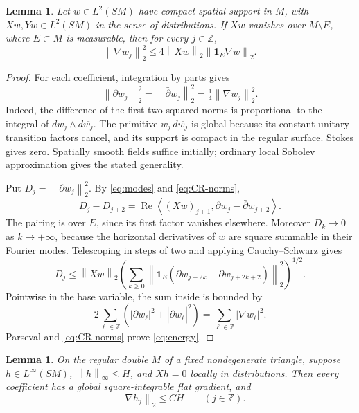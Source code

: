 \documentclass[11pt]{article}
\newtheorem{lemma}[theorem]{Lemma}
\theoremstyle{remark}
\newcommand{\Z}{\mathbb Z}
\newcommand{\ind}{\mathbf 1}
\newcommand{\pa}{\partial}
\newcommand{\pb}{\bar\partial}
\newcommand{\norm}[1]{\left\lVert#1\right\rVert}
\newcommand{\ip}[2]{\left\langle#1,#2\right\rangle}
\begin{document}
\begin{lemma}\label{lem:energy}
Let \(w\in L^2(SM)\) have compact spatial support in \(M\), with
\(Xw,Yw\in L^2(SM)\) in the sense of distributions.
If \(Xw\) vanishes over \(M\setminus E\),
where \(E\subset M\) is measurable, then for every \(j\in\Z\),
\begin{equation}\label{eq:energy}
 \norm{\nabla w_j}_2^2
 \le 4\norm{Xw}_2\norm{\ind_E\nabla w}_2.
\end{equation}
\end{lemma}

\begin{proof}
For each coefficient, integration by parts gives
\begin{equation}\label{eq:CR-norms}
 \norm{\pa w_j}_2^2=\norm{\pb w_j}_2^2
                  =\tfrac14\norm{\nabla w_j}_2^2.
\end{equation}
Indeed, the difference of the first two squared norms is proportional
to the integral of \(dw_j\wedge d\overline{w_j}\). The primitive
\(w_j\,d\overline{w_j}\) is global because its constant unitary
transition factors cancel, and its support is compact in the regular
surface. Stokes gives zero. Spatially smooth fields suffice initially;
ordinary local Sobolev approximation gives the stated generality.

Put \(D_j=\norm{\pa w_j}_2^2\). By \eqref{eq:modes} and
\eqref{eq:CR-norms},
\[
 D_j-D_{j+2}
 =\operatorname{Re}\ip{(Xw)_{j+1}}{\pa w_j-\pb w_{j+2}}.
\]
The pairing is over \(E\), since its first factor vanishes elsewhere.
Moreover \(D_k\to0\) as \(k\to+\infty\), because the horizontal
derivatives of \(w\) are square summable in their Fourier modes.
Telescoping in steps of two and applying Cauchy--Schwarz gives
\[
 D_j\le\norm{Xw}_2
 \left(\sum_{k\ge0}
  \norm{\ind_E(\pa w_{j+2k}-\pb w_{j+2k+2})}_2^2\right)^{1/2}.
\]
Pointwise in the base variable, the sum inside is bounded by
\[
 2\sum_{\ell\in\Z}(|\pa w_\ell|^2+|\pb w_\ell|^2)
       =\sum_{\ell\in\Z}|\nabla w_\ell|^2.
\]
Parseval and \eqref{eq:CR-norms} prove \eqref{eq:energy}.
\end{proof}

\begin{lemma}\label{lem:bounded-modes}
On the regular double \(M\) of a fixed nondegenerate triangle,
suppose \(h\in L^\infty(SM)\), \(\norm{h}_\infty\le H\), and
\(Xh=0\) locally in distributions. Then every coefficient has a
global square-integrable flat gradient, and
\begin{equation}\label{eq:bounded-modes}
 \norm{\nabla h_j}_2\le CH\qquad(j\in\Z).
\end{equation}
\end{lemma}
\end{document}
